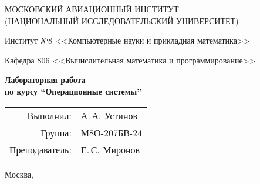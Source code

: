 \begin{titlepage}
\begin{center}
\large
МОСКОВСКИЙ АВИАЦИОННЫЙ ИНСТИТУТ\\ (НАЦИОНАЛЬНЫЙ ИССЛЕДОВАТЕЛЬСКИЙ УНИВЕРСИТЕТ)

\vspace{20pt}

Институт №8 <<Компьютерные науки и прикладная математика>>

Кафедра 806 <<Вычислительная математика и программирование>>
\end{center}

\vspace{60pt}

\begin{center}
\bfseries
\large
Лабораторная работа  \\по курсу \enquote{Операционные системы}

\vspace{54pt}

\end{center}

\vfill

\begin{flushright}
\large
\begin{tabular}{rl}
Выполнил: & А.\,А. Устинов \\
Группа: & М8О-207БВ-24 \\
Преподаватель: & Е.\,С. Миронов \\
\end{tabular}
\end{flushright}

\vspace{92pt}

\begin{center}
\large
Москва, \the\year
\end{center}
\end{titlepage}

\pagebreak